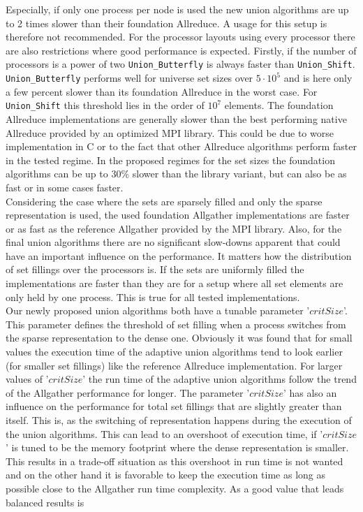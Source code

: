 Especially, if only one process per node is used the new union algorithms are up to 2 times slower than their foundation Allreduce. A usage for this setup is therefore not recommended. For the processor layouts using every processor there are also restrictions where good performance is expected. Firstly, if the number of processors is a power of two \texttt{Union\_Butterfly} is always faster than \texttt{Union\_Shift}. \texttt{Union\_Butterfly} performs well for universe set sizes over $5\cdot10^5$ and is here only a few percent slower than its foundation Allreduce in the worst case. For \texttt{Union\_Shift} this threshold lies in the order of $10^7$ elements. The foundation Allreduce implementations are generally slower than the best performing native Allreduce provided by an optimized MPI library. This could be due to worse implementation in C or to the fact that other Allreduce algorithms perform faster in the tested regime. In the proposed regimes for the set sizes the foundation algorithms can be up to 30\% slower than the library variant, but can also be as fast or in some cases faster.\\ 
Considering the case where the sets are sparsely filled and only the sparse representation is used, the used foundation Allgather implementations are faster or as fast as the reference Allgather provided by the MPI library. Also, for the final union algorithms there are no significant slow-downs apparent that could have an important influence on the performance. It matters how the distribution of set fillings over the processors is. If the sets are uniformly filled the implementations are faster than they are for a setup where all set elements are only held by one process. This is true for all tested implementations.\\
Our newly proposed union algorithms both have a tunable parameter '$critSize$'. This parameter defines the threshold of set filling when a process switches from the sparse representation to the dense one. Obviously it was found that for small values the execution time of the adaptive union algorithms tend to look earlier (for smaller set fillings) like the reference Allreduce implementation. For larger values of '$critSize$' the run time of the adaptive union algorithms follow the trend of the Allgather performance for longer. The parameter '$critSize$' has also an influence on the performance for total set fillings that are slightly greater than itself. This is, as the switching of representation happens during the execution of the union algorithms. This can lead to an overshoot of execution time, if '$critSize$' is tuned to be the memory footprint where the dense representation is smaller. This results in a trade-off situation as this overshoot in run time is not wanted and on the other hand it is favorable to keep the execution time as long as possible close to the Allgather run time complexity. As a good value that leads balanced results is 

